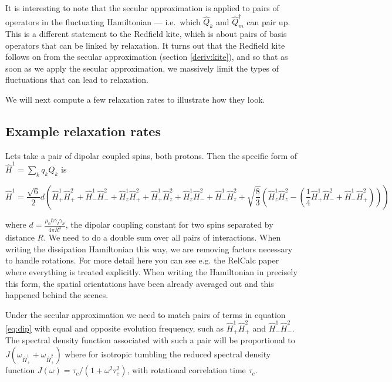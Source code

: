 \documentclass[notitlepage,11pt]{article}
\begin{document}
It is interesting to note that the secular approximation is applied to pairs of operators in the fluctuating Hamiltonian — i.e.\ which $\hat{Q}_k$ and $\hat{Q}_m^\dagger$ can pair up. This is a different statement to the Redfield kite, which is about pairs of basis operators that can be linked by relaxation. It turns out that the Redfield kite follows on from the secular approximation (section \ref{deriv:kite}), and so that as soon as we apply the secular approximation, we massively limit the types of fluctuations that can lead to relaxation.

We will next compute a few relaxation rates to illustrate how they look.


\subsection{Example relaxation rates}

Lets take a pair of dipolar coupled spins, both protons. Then the specific form of $\hat{H}^1=\sum_kq_k\hat{Q}_k$ is

\begin{small}
\begin{equation}
\hat{H}^1 =  \frac{\sqrt{6}}{2} d\left( \hat{H}^1_+\hat{H}^2_+ + \hat{H}^1_-\hat{H}^2_-  + \hat{H}^1_z\hat{H}^2_+  + \hat{H}^1_+\hat{H}^2_z  + \hat{H}^1_z\hat{H}^2_-  + \hat{H}^1_-\hat{H}^2_z +  \sqrt{\frac{8}{3}}\left(\hat{H}^1_z\hat{H}^2_z  -\left(\frac{1}{4}\hat{H}^1_+\hat{H}^2_-  +\hat{H}^1_-\hat{H}^2_+\right)\right)\right)
\label{eq:dip}
\end{equation}
\end{small}

where $d=\frac{\mu_0\hbar\gamma_I\gamma_S}{4\pi R^3}$, the dipolar coupling constant for two spins separated by distance $R$. We need to do a double sum over all pairs of interactions. When writing the dissipation Hamiltonian this way, we are removing factors necessary to handle rotations. For more detail here you can see e.g. the RelCalc paper where everything is treated explicitly. When writing the Hamiltonian in precisely this form, the spatial orientations have been already averaged out and this happened behind the scenes.

Under the secular approximation we need to match pairs of terms in equation \ref{eq:dip} with equal and opposite evolution frequency, such as $\hat{H}^1_+\hat{H}^2_+$ and $\hat{H}^1_-\hat{H}^2_-$. The spectral density function associated with such a pair will be proportional to $J(\omega_{\hat{H}^1_+}+\omega_{\hat{H}^2_+})$ where for isotropic tumbling the reduced spectral density function $J(\omega)=\tau_c/(1+\omega^2\tau_c^2)$, with rotational correlation time $\tau_c$.  
\end{document}
